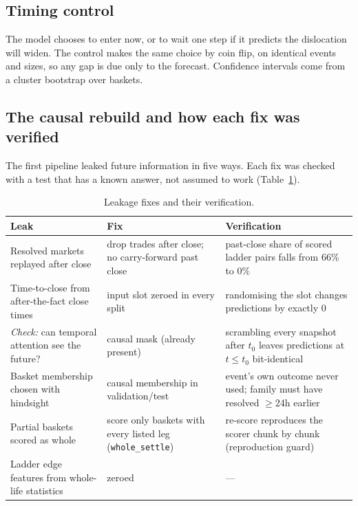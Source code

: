 \documentclass[11pt,a4paper]{article}
\begin{document}
\subsection{Timing control}
The model chooses to enter now, or to wait one step if it predicts the
dislocation will widen. The control makes the same choice by coin flip, on
identical events and sizes, so any gap is due only to the forecast. Confidence
intervals come from a cluster bootstrap over baskets.

\subsection{The causal rebuild and how each fix was verified}\label{sec:fixes}
The first pipeline leaked future information in five ways. Each fix was checked
with a test that has a known answer, not assumed to work (Table~\ref{tab:fixes}).

\begin{table}[h]
\centering
\small
\caption{Leakage fixes and their verification.}
\label{tab:fixes}
\begin{tabular}{p{4.2cm}p{4.6cm}p{5.4cm}}
\toprule
Leak & Fix & Verification \\
\midrule
Resolved markets replayed after close & drop trades after close; no carry-forward
past close & past-close share of scored ladder pairs falls from 66\% to 0\% \\
Time-to-close from after-the-fact close times & input slot zeroed in every split &
randomising the slot changes predictions by exactly 0 \\
\emph{Check:} can temporal attention see the future? & causal mask (already present) &
scrambling every snapshot after $t_0$ leaves predictions at $t\le t_0$
bit-identical \\
Basket membership chosen with hindsight & causal membership in validation/test &
event's own outcome never used; family must have resolved $\ge$24h earlier \\
Partial baskets scored as whole & score only baskets with every listed leg
(\texttt{whole\_settle}) & re-score reproduces the scorer chunk by chunk
(reproduction guard) \\
Ladder edge features from whole-life statistics & zeroed & --- \\
\bottomrule
\end{tabular}
\end{table}
\end{document}
